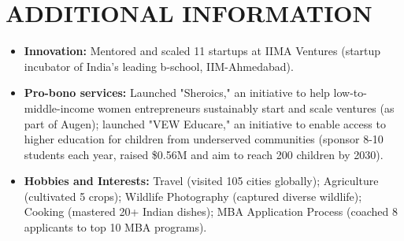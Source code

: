 \documentclass[10pt, letterpaper]{article}
\newenvironment{highlights}{
    \begin{itemize}[
        topsep=0.10 cm,
        parsep=0.10 cm,
        partopsep=0pt,
        itemsep=0pt,
        leftmargin=10pt
    ]
}{
    \end{itemize}
}
\begin{document}
    \section{ADDITIONAL INFORMATION}
    \begin{highlights}
      \item \textbf{Innovation:} Mentored and scaled 11 startups at IIMA Ventures (startup incubator of India's leading b-school, IIM-Ahmedabad).
      \item \textbf{Pro-bono services:} Launched "Sheroics," an initiative to help low-to-middle-income women entrepreneurs sustainably start and scale ventures (as part of Augen); launched "VEW Educare," an initiative to enable access to higher education for children from underserved communities (sponsor 8-10 students each year, raised \$0.56M and aim to reach 200 children by 2030).
      \item \textbf{Hobbies and Interests:} Travel (visited 105 cities globally); Agriculture (cultivated 5 crops); Wildlife Photography (captured diverse wildlife); Cooking (mastered 20+ Indian dishes); MBA Application Process (coached 8 applicants to top 10 MBA programs).
    \end{highlights}
\end{document}
